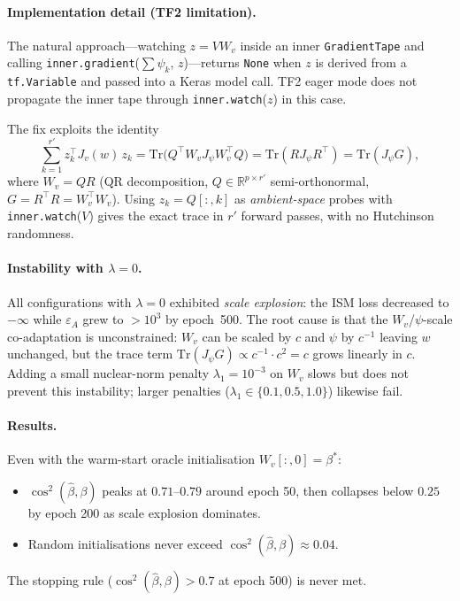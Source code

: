 \documentclass[11pt]{article}
\newcommand{\R}{\mathbb{R}}
\begin{document}
\paragraph{Implementation detail (TF2 limitation).}
The natural approach---watching $z = V W_v$ inside an inner
\texttt{GradientTape} and calling \texttt{inner.gradient}($\sum\psi_k$, $z$)---returns
\texttt{None} when $z$ is derived from a \texttt{tf.Variable} and passed into a
Keras model call.  TF2 eager mode does not propagate the inner tape through
\texttt{inner.watch}($z$) in this case.

The fix exploits the identity
\[
  \sum_{k=1}^{r'} z_k^\top J_v(w)\, z_k
  = \mathrm{Tr}\!\bigl(Q^\top W_v J_\psi W_v^\top Q\bigr)
  = \mathrm{Tr}(R J_\psi R^\top)
  = \mathrm{Tr}(J_\psi G),
\]
where $W_v = QR$ (QR decomposition, $Q\in\R^{p\times r'}$ semi-orthonormal,
$G=R^\top R = W_v^\top W_v$).  Using $z_k = Q[:,k]$ as \emph{ambient-space}
probes with \texttt{inner.watch}($V$) gives the exact trace in $r'$ forward
passes, with no Hutchinson randomness.

\paragraph{Instability with $\lambda=0$.}
All configurations with $\lambda=0$ exhibited \emph{scale explosion}: the ISM
loss decreased to $-\infty$ while $\varepsilon_A$ grew to $>10^3$ by epoch~500.
The root cause is that the $W_v$/$\psi$-scale co-adaptation is unconstrained:
$W_v$ can be scaled by $c$ and $\psi$ by $c^{-1}$ leaving $w$ unchanged, but
the trace term $\mathrm{Tr}(J_\psi G)\propto c^{-1}\cdot c^2 = c$ grows
linearly in $c$.  Adding a small nuclear-norm penalty $\lambda_1=10^{-3}$ on
$W_v$ slows but does not prevent this instability; larger penalties ($\lambda_1\in\{0.1,0.5,1.0\}$) likewise fail.

\paragraph{Results.}
Even with the warm-start oracle initialisation $W_v[:,0]=\beta^*$:
\begin{itemize}
  \item $\cos^2(\hat\beta,\beta)$ peaks at $0.71$--$0.79$ around epoch 50,
        then collapses below $0.25$ by epoch 200 as scale explosion dominates.
  \item Random initialisations never exceed $\cos^2(\hat\beta,\beta)\approx0.04$.
\end{itemize}
The stopping rule ($\cos^2(\hat\beta,\beta)>0.7$ at epoch 500) is never met.
\end{document}

